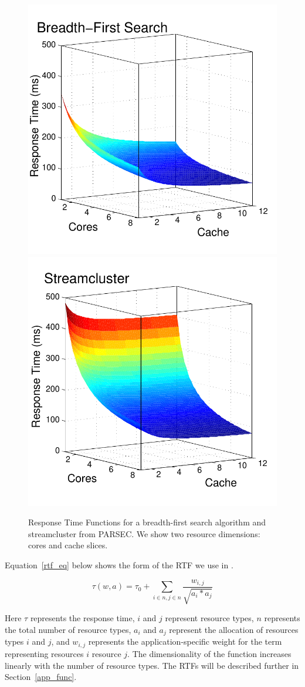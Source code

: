 \begin{figure}[hb]
\includegraphics*[bb=0 0 360 360,width=.49\columnwidth]{bfs-fig.pdf}
\includegraphics*[bb=0 0 360
  360,width=.49\columnwidth]{streamcluster-fig.pdf}
\caption{\label{sample_rtf} Response Time Functions for a
  breadth-first search algorithm and streamcluster from PARSEC. We show two resource dimensions: cores and cache slices.}
\end{figure}

Equation~\ref{rtf_eq} below shows the form of the RTF we use in \pacora.

\begin{equation}\label{rtf_eq}
\tau(w,a) = \tau_0 + \sum_{i\in n,j\in n}{\frac{w_{i,j}}{\sqrt{a_i * a_j}}}
\end{equation}

Here $\tau$ represents the response time, $i$ and $j$ represent
resource types, $n$ represents the total number of resource types,
$a_{i}$ and $a_{j}$ represent the allocation of resources types $i$
and $j$, and $w_{i,j}$ represents the application-specific weight for
the term representing resources $i$ resource $j$.  The dimensionality
of the function increases linearly with the number of resource
types. The RTFs will be described further in Section~\ref{app_func}.

